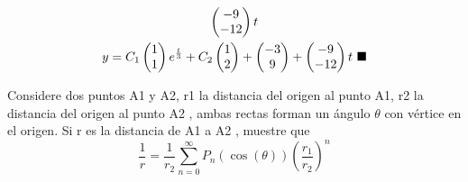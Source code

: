 \begin{mdframed}
\begin{enumerate}
\begin{gather*}
\begin{pmatrix}
                -9 \\
                -12 
        \end{pmatrix}t\\
         y = C_1 \begin{pmatrix}
                1 \\
                1 
                \end{pmatrix}
            e^{\frac{t}{3}}
            + C_2 \begin{pmatrix}
                1 \\
                2 
                \end{pmatrix} +\begin{pmatrix}
                -3 \\
                9 
        \end{pmatrix}+\begin{pmatrix}
                -9 \\
                -12 
        \end{pmatrix}t \text{\space} \blacksquare
    \end{gather*}
\end{enumerate}
\end{mdframed}



\begin{prob}
Considere dos puntos A1 y A2, r1 la distancia del origen al punto A1, r2 la distancia del
origen al punto A2 , ambas rectas forman un ángulo $\theta$ con vértice en el origen. Si r es la
distancia de A1 a A2 , muestre que
$$\frac{1}{r} = \frac{1}{r_2}\sum_{n=0}^\infty P_n(\cos(\theta))\left(\frac{r_1}{r_2}\right)^n$$
\end{prob}
    
